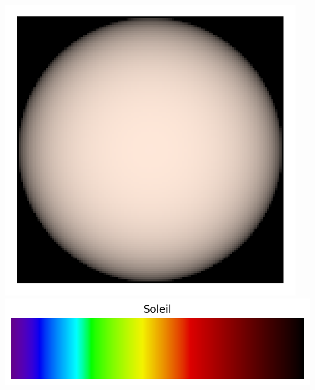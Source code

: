 \documentclass[12pt,a4paper,fleqn]{article}
\begin{document}
\begin{center}
\newcommand{\localheight}{75 pt}
\includegraphics[height=\localheight]{images/star_sun.png}
\includegraphics[height=\localheight]{images/spectrum_star_sun.png}


\end{center}
\end{document}
